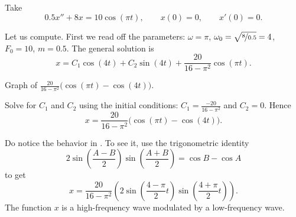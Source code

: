 \begin{example}
Take
\begin{equation*}
0.5 x'' + 8 x = 10 \cos (\pi t), \qquad x(0)=0, \qquad x'(0)=0 .
\end{equation*}

Let us compute.  First we read off the parameters:
$\omega = \pi$, $\omega_0 = \sqrt{\nicefrac{8}{0.5}} = 4$, $F_0 = 10$,
$m=0.5$.  The general solution is
\begin{equation*}
x = C_1 \cos (4 t) + C_2 \sin (4 t) +
\frac{20}{16 - \pi^2} \cos (\pi t) .
\end{equation*}

\begin{mywrapfig}[15]{3.25in}
\capstart
{}
\caption{Graph of
$\frac{20}{16 - \pi^2} \bigl( \cos (\pi t)- \cos (4 t) \bigr)$.\label{3.6:beatingfig}}
\end{mywrapfig}
%
%


Solve for $C_1$ and $C_2$ using the initial conditions:
$C_1 = \frac{-20}{16 - \pi^2}$ and $C_2 = 0$.  Hence
\begin{equation*}
x = 
\frac{20}{16 - \pi^2} \bigl( \cos (\pi t)- \cos (4 t) \bigr) .
\end{equation*}


Do notice the  behavior
in .  To see it,
use the 
trigonometric identity
\begin{equation*}
2\sin \left( \frac{A-B}{2} \right) \sin \left( \frac{A+B}{2} \right) =
\cos B -\cos A 
\end{equation*}
to get 
\begin{equation*}
x = 
\frac{20}{16 - \pi^2} \left( 2 \sin \left(\frac{4-\pi}{2} t \right)
\sin \left( \frac{4+\pi}{2} t \right) \right) .
\end{equation*}
The function $x$ is a high-frequency wave modulated by a low-frequency
wave.
\end{example}

